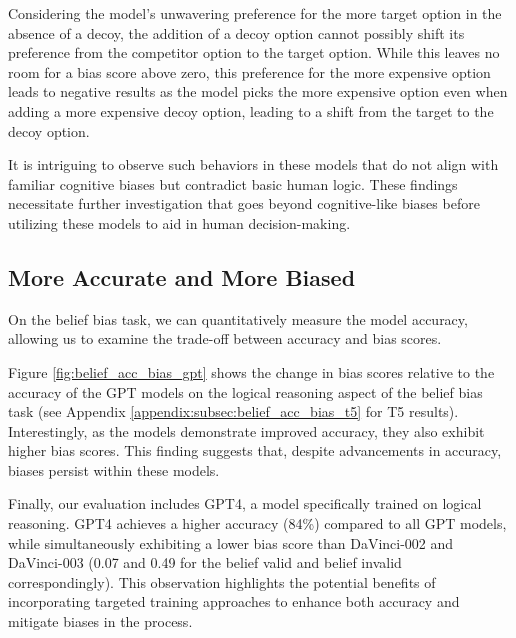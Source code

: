 Considering the model's unwavering preference for the more target option in the absence of a decoy,  the addition of a decoy option cannot possibly shift its preference from the competitor option to the target option.
While this leaves no room for a bias score above zero, this preference for the more expensive option leads to negative results as the model picks the more expensive option even when adding a more expensive decoy option, leading to a shift from the target to the decoy option.

It is intriguing to observe such behaviors in these models that do not align with familiar cognitive biases but contradict basic human logic.
These findings necessitate further investigation that goes beyond cognitive-like biases before utilizing these models to aid in human decision-making.


\subsection{More Accurate and More Biased} \label{subsec:belief_acc_bias}



On the belief bias task, we can quantitatively measure the model accuracy, allowing us to examine the trade-off between accuracy and bias scores.

Figure \ref{fig:belief_acc_bias_gpt} shows the change in bias scores relative to the accuracy of the GPT models on the logical reasoning aspect of the belief bias task (see Appendix \ref{appendix:subsec:belief_acc_bias_t5} for  T5 results).
Interestingly, as the models demonstrate improved accuracy,  they also exhibit higher bias scores. This finding suggests that, despite advancements in accuracy, biases persist within these models.


Finally, our evaluation includes GPT4, a model specifically trained on logical reasoning.
GPT4 achieves a higher accuracy (84\%) compared to all GPT models, while simultaneously exhibiting a lower bias score than DaVinci-002 and DaVinci-003 (0.07 and 0.49 for the belief valid and belief invalid correspondingly).
This observation highlights the potential benefits of incorporating targeted training approaches to enhance both accuracy and mitigate biases in the process.




